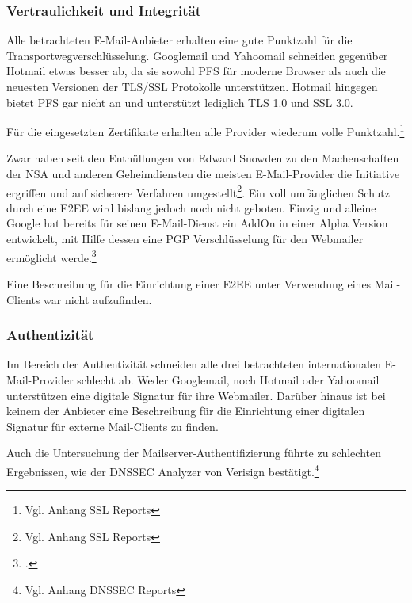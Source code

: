 \documentclass  [paper=a4,
				fontsize=12pt,
				listof=totoc,
				bibliography=totoc
				]{scrreprt}
\begin{document}
			\subsubsection{Vertraulichkeit und Integrität}
			Alle betrachteten E-Mail-Anbieter erhalten eine gute Punktzahl für die Transportwegverschlüsselung. Googlemail und Yahoomail schneiden gegenüber Hotmail etwas besser ab, da sie sowohl \ac{PFS} für moderne Browser als auch die neuesten Versionen der \ac{TLS/SSL} Protokolle unterstützen. Hotmail hingegen bietet \ac{PFS} gar nicht an und unterstützt lediglich \ac{TLS} 1.0 und \ac{SSL} 3.0.
			
			Für die eingesetzten Zertifikate erhalten alle Provider wiederum volle Punktzahl.\footnote{Vgl. Anhang SSL Reports}
			\medskip
			
			Zwar haben seit den Enthüllungen von Edward Snowden zu den Machenschaften der \ac{NSA} und anderen Geheimdiensten die meisten E-Mail-Provider die Initiative ergriffen und  auf sicherere Verfahren umgestellt\footnote{Vgl. Anhang SSL Reports}. Ein voll umfänglichen Schutz durch eine \ac{E2EE} wird bislang jedoch noch nicht geboten. Einzig und alleine Google hat bereits für seinen E-Mail-Dienst ein AddOn in einer Alpha Version entwickelt, mit Hilfe dessen eine PGP Verschlüsselung für den Webmailer ermöglicht werde.\footcite[Vgl.][]{Kirsch} 
			
			Eine Beschreibung für die Einrichtung einer \ac{E2EE} unter Verwendung eines Mail-Clients war nicht aufzufinden.
			
			
			\subsubsection{Authentizität}
			Im Bereich der Authentizität schneiden alle drei betrachteten internationalen E-Mail-Provider schlecht ab.
			Weder Googlemail, noch Hotmail oder Yahoomail unterstützen eine digitale Signatur für ihre Webmailer. Darüber hinaus ist bei keinem der Anbieter eine Beschreibung für die Einrichtung einer digitalen Signatur für externe Mail-Clients zu finden. 
			\medskip
			
			Auch die Untersuchung der Mailserver-Authentifizierung führte zu schlechten Ergebnissen, wie der \ac{DNSSEC} Analyzer von Verisign bestätigt.\footnote{Vgl. Anhang DNSSEC Reports} 
		
		
\end{document}

